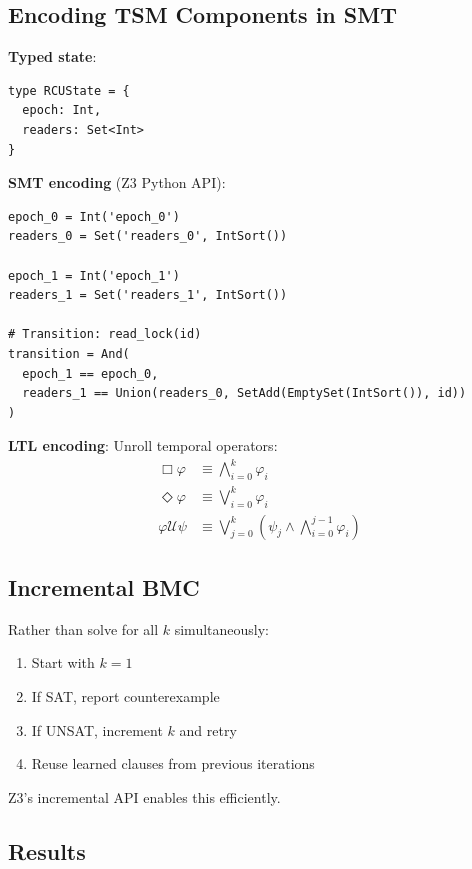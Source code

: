 \documentclass[conference]{IEEEtran}
\begin{document}
\subsection{Encoding TSM Components in SMT}

\textbf{Typed state}:
\begin{lstlisting}
type RCUState = {
  epoch: Int,
  readers: Set<Int>
}
\end{lstlisting}

\textbf{SMT encoding} (Z3 Python API):
\begin{verbatim}
epoch_0 = Int('epoch_0')
readers_0 = Set('readers_0', IntSort())

epoch_1 = Int('epoch_1')
readers_1 = Set('readers_1', IntSort())

# Transition: read_lock(id)
transition = And(
  epoch_1 == epoch_0,
  readers_1 == Union(readers_0, SetAdd(EmptySet(IntSort()), id))
)
\end{verbatim}

\textbf{LTL encoding}: Unroll temporal operators:
\begin{align}
\Box\varphi &\equiv \bigwedge_{i=0}^{k} \varphi_i \\
\Diamond\varphi &\equiv \bigvee_{i=0}^{k} \varphi_i \\
\varphi \mathbin{\mathcal{U}} \psi &\equiv \bigvee_{j=0}^{k} \left( \psi_j \wedge \bigwedge_{i=0}^{j-1} \varphi_i \right)
\end{align}

\subsection{Incremental BMC}

Rather than solve for all $k$ simultaneously:
\begin{enumerate}
\item Start with $k=1$
\item If SAT, report counterexample
\item If UNSAT, increment $k$ and retry
\item Reuse learned clauses from previous iterations
\end{enumerate}

Z3's incremental API enables this efficiently.

\subsection{Results}
\end{document}
